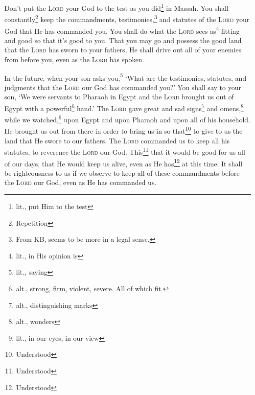 \begin{inparaenum}
     Don't put the \textsc{Lord} your God to the test as you did\footnote{lit., put Him to the test} in Massah.%
     You shall constantly\footnote{Repetition} keep the commandments, testimonies,\footnote{From KB, seems to be more in a legal sense.} and statutes of the \textsc{Lord} your God that He has commanded you.%
     You shall do what the \textsc{Lord} sees as\footnote{lit., in His opinion is} fitting and good so that it's good to you. That you may go and possess the good land that the \textsc{Lord} has sworn to your fathers,%
     He shall drive out all of your enemies from before you, even as the \textsc{Lord} has spoken.%
    
     In the future, when your son asks you,\footnote{lit., saying} `What are the testimonies, statutes, and judgments that the \textsc{Lord} our God has commanded you?'%
     You shall say to your son, `We were servants to Pharaoh in Egypt and the \textsc{Lord} brought us out of Egypt with a powerful\footnote{alt., strong, firm, violent, severe. All of which fit.} hand.'%
     The \textsc{Lord} gave great and sad signs\footnote{alt., distinguishing marks} and omens,\footnote{alt., wonders} while we watched,\footnote{lit., in our eyes, in our view} upon Egypt and upon Pharaoh and upon all of his household.%
     He brought us out from there in order to bring us in so that\footnote{Understood} to give to us the land that He swore to our fathers.%
     The \textsc{Lord} commanded us to keep all his statutes, to reverence the \textsc{Lord} our God. This\footnote{Understood} that it would be good for us all of our days, that He would keep us alive, even as He has\footnote{Understood} at this time.%
     It shall be righteousness to us if we observe to keep all of these commandments before the \textsc{Lord} our God, even as He has commanded us.%
\end{inparaenum}

